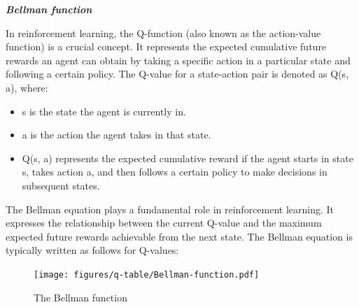 \documentclass{article}
\begin{document}
\textbf{\textit{Bellman function}}

In reinforcement learning, the Q-function (also known as the action-value function) is a crucial concept. It represents the expected cumulative future rewards an agent can obtain by taking a specific action in a particular state and following a certain policy. The Q-value for a state-action pair is denoted as Q(s, a), where:


\begin{itemize}
    \item s is the state the agent is currently in.
    \item a is the action the agent takes in that state.
    \item Q(s, a) represents the expected cumulative reward if the agent starts in state s, takes action a, and then follows a certain policy to make decisions in subsequent states.
\end{itemize}


The Bellman equation plays a fundamental role in reinforcement learning. It expresses the relationship between the current Q-value and the maximum expected future rewards achievable from the next state. The Bellman equation is typically written as follows for Q-values:


\begin{figure}[h]
    \centering
    \texttt{[image: figures/q-table/Bellman-function.pdf]}
    \caption{The Bellman function }
    \label{fig:Bellman-function}
\end{figure}
\end{document}
